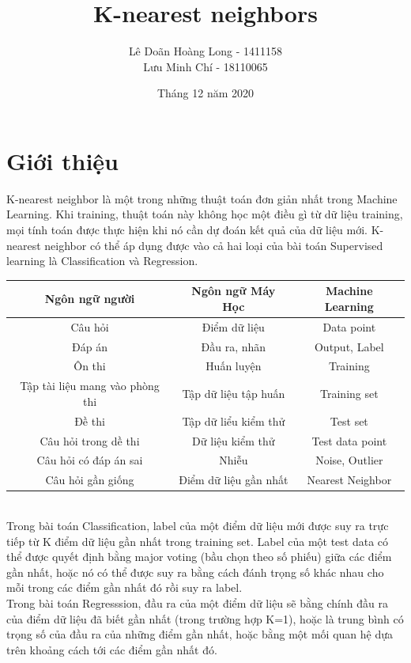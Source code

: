 \documentclass{article}
\title{K-nearest neighbors}
\author{Lê Doãn Hoàng Long - 1411158 \\ Lưu Minh Chí - 18110065}
\date{Tháng 12 năm 2020}
\begin{document}
\maketitle

\section{Giới thiệu}
K-nearest neighbor là một trong những thuật toán đơn giản nhất trong Machine Learning. Khi training, thuật toán này không học một điều gì từ dữ liệu training, mọi tính toán được thực hiện khi nó cần dự đoán kết quả của dữ liệu mới. K-nearest neighbor có thể áp dụng được vào cả hai loại của bài toán Supervised learning là Classification và Regression.

\begin{tabular}{ |c|c|c| }
\hline
\textbf{Ngôn ngữ người} & \textbf{Ngôn ngữ Máy Học} & \textbf{Machine Learning} \\ \hline
Câu hỏi & Điểm dữ liệu & Data point \\ \hline
Đáp án & Đầu ra, nhãn & Output, Label \\ \hline
Ôn thi & Huấn luyện & Training \\ \hline
Tập tài liệu mang vào phòng thi & Tập dữ liệu tập huấn & Training set \\ \hline
Đề thi & Tập dữ liểu kiểm thử & Test set \\ \hline
Câu hỏi trong dề thi & Dữ liệu kiểm thử & Test data point \\ \hline
Câu hỏi có đáp án sai & Nhiễu & Noise, Outlier \\ \hline
Câu hỏi gần giống & Điểm dữ liệu gần nhất & Nearest Neighbor \\
\hline
\end{tabular}
\\

Trong bài toán Classification, label của một điểm dữ liệu mới được suy ra trực tiếp từ K điểm dữ liệu gần nhất trong training set. Label của một test data có thể được quyết định bằng major voting (bầu chọn theo số phiếu) giữa các điểm gần nhất, hoặc nó có thể được suy ra bằng cách đánh trọng số khác nhau cho mỗi trong các điểm gần nhất đó rồi suy ra label.
\\

Trong bài toán Regresssion, đầu ra của một điểm dữ liệu sẽ bằng chính đầu ra của điểm dữ liệu đã biết gần nhất (trong trường hợp K=1), hoặc là trung bình có trọng số của đầu ra của những điểm gần nhất, hoặc bằng một mối quan hệ dựa trên khoảng cách tới các điểm gần nhất đó.
\\
\end{document}
